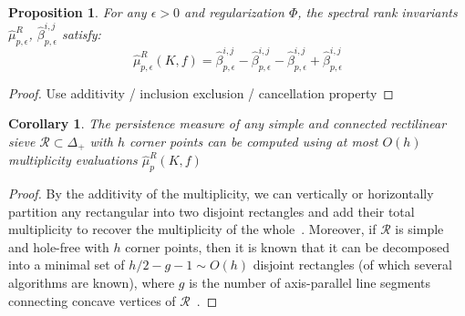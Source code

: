 \documentclass[10pt]{article}
\numberwithin{equation}{section}
\newcommand{\+}{%
	\raisebox{0.18ex}{\scaleobj{0.55}{+}}
}
\newcommand\restr[2]{{%
  \left.\kern-\nulldelimiterspace %
  #1 %
  \vphantom{\big|} %
  \right|_{#2} %
  }}
\newtheorem{proposition}{Proposition}
\newtheorem{corollary}{Corollary}
\theoremstyle{definition}
\theoremstyle{definition}
\begin{document}
\begin{proposition}
For any $\epsilon > 0$ and regularization $\Phi$, the spectral rank invariants $\hat{\mu}_{p,\epsilon}^R$, $\hat{\beta}_{p,\epsilon}^{i,j}$ satisfy: 
$$ \hat{\mu}_{p,\epsilon}^R(K, f)= \hat{\beta}_{p,\epsilon}^{i,j} - \hat{\beta}_{p,\epsilon}^{i,j} - \hat{\beta}_{p,\epsilon}^{i,j} + \hat{\beta}_{p,\epsilon}^{i,j}$$
\end{proposition}
\begin{proof}
	Use additivity / inclusion exclusion / cancellation property 
\end{proof}

\begin{corollary}
	The \emph{persistence measure} of any simple and connected rectilinear sieve $\mathcal{R} \subset \Delta_+$ with $h$ corner points can be computed using at most $O(h)$ multiplicity evaluations $\hat{\mu}_p^R(K,f)$
\end{corollary}
\begin{proof}
	By the additivity of the multiplicity, we can vertically or horizontally partition any rectangular into two disjoint rectangles and add their total multiplicity to recover the multiplicity of the whole~\cite{}. Moreover, if $\mathcal{R}$ is simple and hole-free with $h$ corner points, then it is known that it can be decomposed into a minimal set of $h/2-g-1 \sim O(h)$ disjoint rectangles (of which several algorithms are known), where $g$ is the number of axis-parallel line segments connecting concave vertices of $\mathcal{R}$~\cite{}.
\end{proof}


\end{document}

